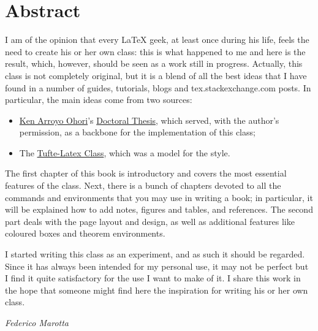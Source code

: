 \chapter*{Abstract}



I am of the opinion that every \LaTeX\xspace geek, at least once during
his life, feels the need to create his or her own class: this is what
happened to me and here is the result, which, however, should be seen as
a work still in progress. Actually, this class is not completely
original, but it is a blend of all the best ideas that I have found in a
number of guides, tutorials, blogs and tex.stackexchange.com posts. In
particular, the main ideas come from two sources:

\begin{itemize}
	\item \href{https://3d.bk.tudelft.nl/ken/en/}{Ken Arroyo Ohori}'s
	      \href{https://3d.bk.tudelft.nl/ken/en/nl/ken/en/2016/04/17/a-1.5-column-layout-in-latex.html}{Doctoral
		      Thesis}, which served, with the author's permission, as a backbone
	      for the implementation of this class;
	\item The
	      \href{https://github.com/Tufte-LaTeX/tufte-latex}{Tufte-Latex
		      Class}, which was a model for the style.
\end{itemize}

The first chapter of this book is introductory and covers the most
essential features of the class. Next, there is a bunch of chapters
devoted to all the commands and environments that you may use in writing
a book; in particular, it will be explained how to add notes, figures
and tables, and references. The second part deals with the page layout
and design, as well as additional features like coloured boxes and
theorem environments.

I started writing this class as an experiment, and as such it should be
regarded. Since it has always been intended for my personal use, it may
not be perfect but I find it quite satisfactory for the use I want to
make of it. I share this work in the hope that someone might find here
the inspiration for writing his or her own class.

\begin{flushright}
	\textit{Federico Marotta}
\end{flushright}
